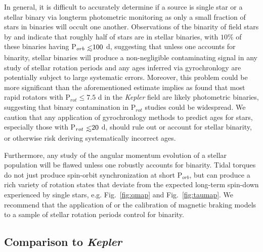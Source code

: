 \documentclass[twocolumn]{aastex61}
\def\lsim{~\rlap{$<$}{\lower 1.0ex\hbox{$\sim$}}}
\newcommand{\kepler}[0]{\textit{Kepler}\xspace}
\begin{document}
In general, it is difficult to accurately determine if a source is single star or a stellar binary via longterm photometric monitoring as only a small fraction of stars in binaries will occult one another. Observations of the binarity of field stars by \citet{Raghavan2010} and \citet{Duchene2013} indicate that roughly half of stars are in stellar binaries, with $10\%$ of these binaries having P$_{orb} \lsim 100$ d, suggesting that unless one accounts for binarity, stellar binaries will produce a non-negligible contaminating signal in any study of stellar rotation periods and any ages inferred via gyrochronlogy are potentially subject to large systematic errors.  Moreover, this problem could be more significant than the aforementioned estimate implies as \citet{Simonian2018} found that most rapid rotators with P$_{rot} \leq 7.5$ d in the \kepler field are likely photometric binaries, suggesting that binary contamination in P$_{rot}$ studies could be widespread. We caution that any application of gyrochronlogy methods to predict ages for stars, especially those with P$_{rot} \lsim 20$ d, should rule out or account for stellar binarity, or otherwise risk deriving systematically incorrect ages.

Furthermore, any study of the angular momentum evolution of a stellar population will be flawed unless one robustly accounts for binarity.  Tidal torques do not just produce spin-orbit synchronization at short P$_{orb}$, but can produce a rich variety of rotation states that deviate from the expected long-term spin-down experienced by single stars, e.g. Fig.~\ref{fig:qmap} and Fig.~\ref{fig:taumap}. We recommend that the application of or the calibration of magnetic braking models to a sample of stellar rotation periods control for binarity.   


\subsection{Comparison to \kepler} \label{sec:kepler}
\end{document}

